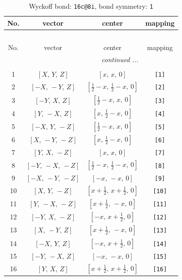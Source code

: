 \documentclass[fleqn,8pt]{jsarticle}
\begin{document}
\begin{longtable}{cccc}
\caption{Wyckoff bond: {\tt 16c@8i}, bond symmetry: {\tt 1}}
 \\
 \hline \hline
No. & vector & center & mapping \\ \hline \endfirsthead

\multicolumn{3}{l}{\tablename\ \thetable{}} \\
 \hline \hline
No. & vector & center & mapping \\ \hline \endhead

 \hline \hline
\multicolumn{3}{r}{\footnotesize\it continued ...} \\ \endfoot

 \hline \hline
\multicolumn{3}{r}{} \\ \endlastfoot

1 & $\left[ X,\, Y,\, Z \right]$ & $\left[ x,\, x,\, 0 \right]$ & {\tt [1]} \\ \hline
2 & $\left[ - X,\, - Y,\, Z \right]$ & $\left[ \frac{1}{2} - x,\, \frac{1}{2} - x,\, 0 \right]$ & {\tt [2]} \\ \hline
3 & $\left[ - Y,\, X,\, Z \right]$ & $\left[ \frac{1}{2} - x,\, x,\, 0 \right]$ & {\tt [3]} \\ \hline
4 & $\left[ Y,\, - X,\, Z \right]$ & $\left[ x,\, \frac{1}{2} - x,\, 0 \right]$ & {\tt [4]} \\ \hline
5 & $\left[ - X,\, Y,\, - Z \right]$ & $\left[ \frac{1}{2} - x,\, x,\, 0 \right]$ & {\tt [5]} \\ \hline
6 & $\left[ X,\, - Y,\, - Z \right]$ & $\left[ x,\, \frac{1}{2} - x,\, 0 \right]$ & {\tt [6]} \\ \hline
7 & $\left[ Y,\, X,\, - Z \right]$ & $\left[ x,\, x,\, 0 \right]$ & {\tt [7]} \\ \hline
8 & $\left[ - Y,\, - X,\, - Z \right]$ & $\left[ \frac{1}{2} - x,\, \frac{1}{2} - x,\, 0 \right]$ & {\tt [8]} \\ \hline
9 & $\left[ - X,\, - Y,\, - Z \right]$ & $\left[ - x,\, - x,\, 0 \right]$ & {\tt [9]} \\ \hline
10 & $\left[ X,\, Y,\, - Z \right]$ & $\left[ x + \frac{1}{2},\, x + \frac{1}{2},\, 0 \right]$ & {\tt [10]} \\ \hline
11 & $\left[ Y,\, - X,\, - Z \right]$ & $\left[ x + \frac{1}{2},\, - x,\, 0 \right]$ & {\tt [11]} \\ \hline
12 & $\left[ - Y,\, X,\, - Z \right]$ & $\left[ - x,\, x + \frac{1}{2},\, 0 \right]$ & {\tt [12]} \\ \hline
13 & $\left[ X,\, - Y,\, Z \right]$ & $\left[ x + \frac{1}{2},\, - x,\, 0 \right]$ & {\tt [13]} \\ \hline
14 & $\left[ - X,\, Y,\, Z \right]$ & $\left[ - x,\, x + \frac{1}{2},\, 0 \right]$ & {\tt [14]} \\ \hline
15 & $\left[ - Y,\, - X,\, Z \right]$ & $\left[ - x,\, - x,\, 0 \right]$ & {\tt [15]} \\ \hline
16 & $\left[ Y,\, X,\, Z \right]$ & $\left[ x + \frac{1}{2},\, x + \frac{1}{2},\, 0 \right]$ & {\tt [16]} \\
\end{longtable}
\end{document}
